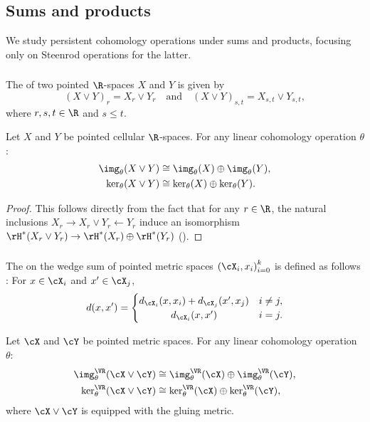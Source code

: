 
\subsection{Sums and products}\label{ss:sums_products}

We study persistent cohomology operations under sums and products, focusing only on Steenrod operations for the latter.

\subsubsection{}\label{ss:wedge_sum_general}

The  of two pointed \(\R\)-spaces \(X\) and \(Y\) is given by
\[
(X \vee Y)_r = X_r \vee Y_r \quad\text{and}\quad (X \vee Y)_{s,t} = X_{s,t} \vee Y_{s,t},
\]
where \(r, s, t \in \R\) and \(s \leq t\).

\lemma
Let $X$ and $Y$ be pointed cellular $\R$-spaces.
For any linear cohomology operation $\theta$:
\begin{align*}
	\img_\theta(X \vee Y) &\cong \img_\theta(X) \oplus \img_\theta(Y), \\
	\ker_\theta(X \vee Y) &\cong \ker_\theta(X) \oplus \ker_\theta(Y).
\end{align*}

\begin{proof}
	This follows directly from the fact that for any \(r \in \R\), the natural inclusions $X_r \to X_r \vee Y_r \leftarrow Y_r$ induce an isomorphism $\rH^*(X_r \vee Y_r) \to \rH^*(X_r) \oplus \rH^*(Y_r)$ (\cite[Cor.~2.25.]{hatcher2000}).
\end{proof}

\subsubsection{}\label{ss:wedge sum}

The  on the wedge sum of pointed metric spaces ${(\cX_i, x_i)}_{i = 0}^k$ is defined as follows \cite{burago2001course}: For $x \in \cX_i$ and $x' \in \cX_j$,
\[
d(x, x') =
\begin{cases}
	d_{\cX_i}(x, x_i) + d_{\cX_j}(x', x_j) & i \neq j, \\
	\hfil d_{\cX_i}(x, x') & i = j.
\end{cases}
\]

\theorem
Let $\cX$ and $\cY$ be pointed metric spaces.
For any linear cohomology operation $\theta$:
\begin{align*}
	\img_\theta^\VR(\cX \vee \cY) &\cong \img_\theta^\VR(\cX) \oplus \img_\theta^\VR(\cY), \\
	\ker_\theta^\VR(\cX \vee \cY) &\cong \ker_\theta^\VR(\cX) \oplus \ker_\theta^\VR(\cY),
\end{align*}
where \(\cX \vee \cY\) is equipped with the gluing metric.

